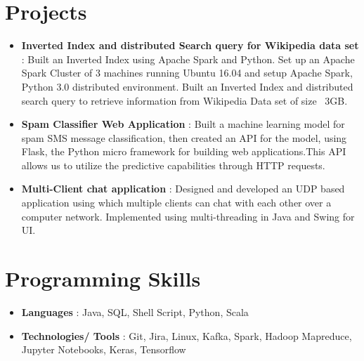 \documentclass[letterpaper,11pt]{article}
\newcommand{\resumeItem}[2]{
  \item\small{
    \textbf{#1}{: #2 \vspace{-2pt}}
  }
}
\newcommand{\resumeSubItem}[2]{\resumeItem{#1}{#2}\vspace{-4pt}}
\newcommand{\resumeSubHeadingListStart}{\begin{itemize}[leftmargin=*]}
\newcommand{\resumeSubHeadingListEnd}{\end{itemize}}
\begin{document}
\section{Projects}
  \resumeSubHeadingListStart
    \resumeSubItem{Inverted Index and distributed Search query for Wikipedia data set }
      {Built an Inverted Index using Apache Spark and Python.
Set up an Apache Spark Cluster of 3 machines running Ubuntu 16.04 and setup Apache Spark, Python 3.0 distributed environment.
Built an Inverted Index and distributed search query to retrieve information from Wikipedia Data set of size ~3GB.}
    
    \resumeSubItem{Spam Classifier Web Application }
      {Built a machine learning model for spam SMS message classification, then created an API for the model, using Flask, the Python micro framework for building web applications.This API allows us to utilize the predictive capabilities through HTTP requests.}
    \resumeSubItem{Multi-Client chat application }
      {Designed and developed an UDP based application using which multiple clients can chat with each other over a computer network. Implemented using multi-threading in Java and Swing for UI.}
  \resumeSubHeadingListEnd


\section{Programming Skills}
  \resumeSubHeadingListStart
    \resumeSubItem{Languages }{Java, SQL, Shell Script, Python, Scala}
    \resumeSubItem{Technologies/ Tools }{Git, Jira, Linux, Kafka, Spark, Hadoop Mapreduce, Jupyter Notebooks, Keras, Tensorflow}
  \resumeSubHeadingListEnd


\end{document}
